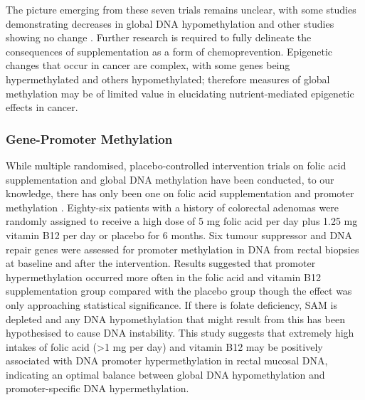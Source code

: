 \noindent The picture emerging from these seven trials remains unclear, with some studies demonstrating decreases in global DNA hypomethylation \cite{c254,c256} and other studies showing no change \cite{c251,c252,c257}. Further research is required to fully delineate the consequences of supplementation as a form of chemoprevention. Epigenetic changes that occur in cancer are complex, with some genes being hypermethylated and others hypomethylated; therefore measures of global methylation may be of limited value in elucidating nutrient-mediated epigenetic effects in cancer. 
 
\subsubsection{Gene-Promoter Methylation} %
\noindent While multiple randomised, placebo-controlled intervention trials on folic acid supplementation and global DNA methylation have been conducted, to our knowledge, there has only been one on folic acid supplementation and promoter methylation \cite{c258}. Eighty-six patients with a history of colorectal adenomas were randomly assigned to receive a high dose of 5 mg folic acid per day plus 1.25 mg vitamin B12 per day or placebo for 6 months. Six tumour suppressor and DNA repair genes were assessed for promoter methylation in DNA from rectal biopsies at baseline and after the intervention. Results suggested that promoter hypermethylation occurred more often in the folic acid and vitamin B12 supplementation group compared with the placebo group though the effect was only approaching statistical significance. If there is folate deficiency, SAM is depleted and any DNA hypomethylation that might result from this has been hypothesised to cause DNA instability. This study suggests that extremely high intakes 
of folic acid (>1 mg per day) and vitamin B12 may be positively associated with DNA promoter hypermethylation in rectal mucosal DNA, indicating an optimal balance between global DNA hypomethylation and promoter-specific DNA hypermethylation. 
 
